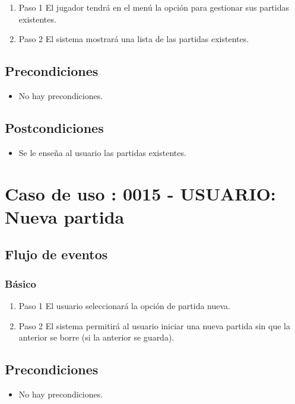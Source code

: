 \begin{enumerate}
\item Paso 1
El jugador tendrá en el menú la opción para gestionar sus partidas existentes.
\item Paso 2
El sistema mostrará una lista de las partidas existentes.
\end{enumerate}

\subsection{Precondiciones}
\begin{itemize}
\item No hay precondiciones.
\end{itemize}
\subsection{Postcondiciones}
\begin{itemize}
\item Se le enseña al usuario las partidas existentes. 
\end{itemize}



\section{Caso de uso : 0015 - USUARIO: Nueva partida}\label{sec:uc0}

\subsection{Flujo de eventos}

\subsubsection{Básico}

\begin{enumerate}
\item Paso 1
El usuario seleccionará la opción de partida nueva. 
\item Paso 2
El sistema permitirá al usuario iniciar una nueva partida sin que la anterior se borre (si la anterior se guarda). 
\end{enumerate}

\subsection{Precondiciones}
\begin{itemize}
\item No hay precondiciones.
\end{itemize}

